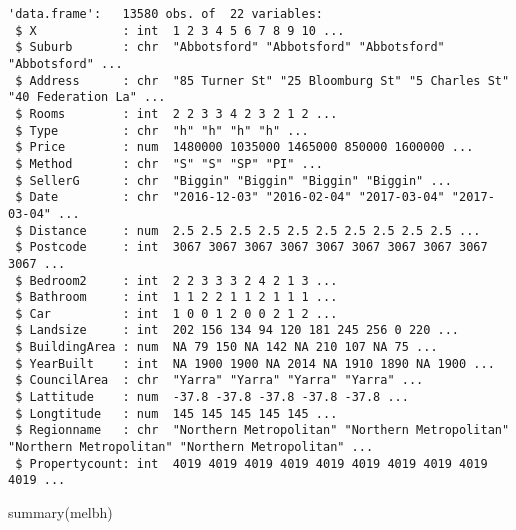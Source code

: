 \documentclass[
  letterpaper,
  DIV=11,
  numbers=noendperiod]{scrartcl}
\newenvironment{Shaded}{\begin{snugshade}}{\end{snugshade}}
\newcommand{\FunctionTok}[1]{\textcolor[rgb]{0.28,0.35,0.67}{#1}}
\newcommand{\NormalTok}[1]{\textcolor[rgb]{0.00,0.23,0.31}{#1}}
\begin{document}
\begin{verbatim}
'data.frame':   13580 obs. of  22 variables:
 $ X            : int  1 2 3 4 5 6 7 8 9 10 ...
 $ Suburb       : chr  "Abbotsford" "Abbotsford" "Abbotsford" "Abbotsford" ...
 $ Address      : chr  "85 Turner St" "25 Bloomburg St" "5 Charles St" "40 Federation La" ...
 $ Rooms        : int  2 2 3 3 4 2 3 2 1 2 ...
 $ Type         : chr  "h" "h" "h" "h" ...
 $ Price        : num  1480000 1035000 1465000 850000 1600000 ...
 $ Method       : chr  "S" "S" "SP" "PI" ...
 $ SellerG      : chr  "Biggin" "Biggin" "Biggin" "Biggin" ...
 $ Date         : chr  "2016-12-03" "2016-02-04" "2017-03-04" "2017-03-04" ...
 $ Distance     : num  2.5 2.5 2.5 2.5 2.5 2.5 2.5 2.5 2.5 2.5 ...
 $ Postcode     : int  3067 3067 3067 3067 3067 3067 3067 3067 3067 3067 ...
 $ Bedroom2     : int  2 2 3 3 3 2 4 2 1 3 ...
 $ Bathroom     : int  1 1 2 2 1 1 2 1 1 1 ...
 $ Car          : int  1 0 0 1 2 0 0 2 1 2 ...
 $ Landsize     : int  202 156 134 94 120 181 245 256 0 220 ...
 $ BuildingArea : num  NA 79 150 NA 142 NA 210 107 NA 75 ...
 $ YearBuilt    : int  NA 1900 1900 NA 2014 NA 1910 1890 NA 1900 ...
 $ CouncilArea  : chr  "Yarra" "Yarra" "Yarra" "Yarra" ...
 $ Lattitude    : num  -37.8 -37.8 -37.8 -37.8 -37.8 ...
 $ Longtitude   : num  145 145 145 145 145 ...
 $ Regionname   : chr  "Northern Metropolitan" "Northern Metropolitan" "Northern Metropolitan" "Northern Metropolitan" ...
 $ Propertycount: int  4019 4019 4019 4019 4019 4019 4019 4019 4019 4019 ...
\end{verbatim}

\begin{Shaded}
\begin{Highlighting}[]
\FunctionTok{summary}\NormalTok{(melbh)}
\end{Highlighting}
\end{Shaded}
\end{document}

